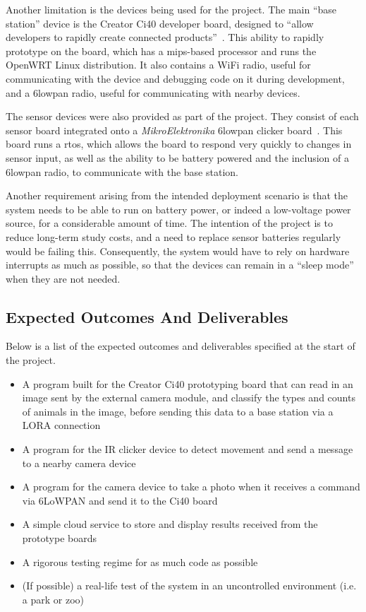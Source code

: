 Another limitation is the devices being used for the project. The main ``base
station'' device is the Creator Ci40 developer board, designed to ``allow
developers to rapidly create connected products''~\cite{creatorci40}. This
ability to rapidly prototype on the board, which has a \acrshort{mips}-based
processor and runs the OpenWRT Linux distribution. It also contains a WiFi
radio, useful for communicating with the device and debugging code on it
during development, and a \gls{6lowpan} radio, useful for communicating with
nearby devices.

The sensor devices were also provided as part of the project. They consist of
each sensor board integrated onto a \textit{MikroElektronika} \gls{6lowpan}
clicker board~\cite{mikroeclick}. This board runs a \acrfull{rtos}, which
allows the board to respond very quickly to changes in sensor input, as well
as the ability to be battery powered and the inclusion of a \gls{6lowpan}
radio, to communicate with the base station.

Another requirement arising from the intended deployment scenario is that the
system needs to be able to run on battery power, or indeed a low-voltage
power source, for a considerable amount of time. The intention of the project
is to reduce long-term study costs, and a need to replace sensor batteries
regularly would be failing this. Consequently, the system would have to rely
on hardware interrupts as much as possible, so that the devices can remain in
a ``sleep mode'' when they are not needed.

\subsection{Expected Outcomes And Deliverables}
Below is a list of the expected outcomes and deliverables specified at the
start of the project.

\begin{itemize}
    \item A program built for the Creator Ci40 prototyping board that can read
        in an image sent by the external camera module, and classify the types
        and counts of animals in the image, before sending this data to a base
        station via a LORA connection
    \item A program for the IR clicker device to detect movement and send a
        message to a nearby camera device
    \item A program for the camera device to take a photo when it receives a
        command via 6LoWPAN and send it to the Ci40 board
    \item A simple cloud service to store and display results received from the
        prototype boards
    \item A rigorous testing regime for as much code as possible
    \item (If possible) a real-life test of the system in an uncontrolled
        environment (i.e. a park or zoo)
\end{itemize}

